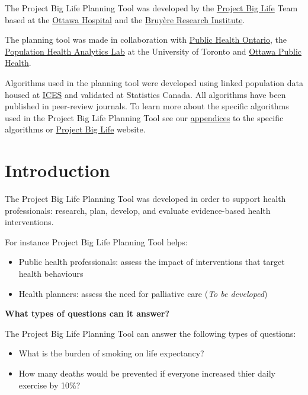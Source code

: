\documentclass[]{book}
\providecommand{\tightlist}{%
  \setlength{\itemsep}{0pt}\setlength{\parskip}{0pt}}
\begin{document}
The Project Big Life Planning Tool was developed by the \href{https://www.projectbiglife.ca}{Project Big Life} Team based at the \href{http://www.ohri.ca/home.asp}{Ottawa Hospital} and the \href{https://www.bruyere.org/en/bruyere-research-institute}{Bruyère Research Institute}.

The planning tool was made in collaboration with \href{https://www.publichealthontario.ca/}{Public Health Ontario}, the \href{https://pophealthanalytics.com/}{Population Health Analytics Lab} at the University of Toronto and \href{http://www.ottawapublichealth.ca/en/index.aspx}{Ottawa Public Health}.

Algorithms used in the planning tool were developed using linked population data housed at \href{https://www.ices.on.ca/}{ICES} and validated at Statistics Canada. All algorithms have been published in peer-review journals. To learn more about the specific algorithms used in the Project Big Life Planning Tool see our \protect\hyperlink{mport}{appendices} to the specific algorithms or \href{https://www.projectbiglife.ca/science}{Project Big Life} website.

\hypertarget{introduction}{%
\chapter{Introduction}\label{introduction}}

The Project Big Life Planning Tool was developed in order to support health professionals: research, plan, develop, and evaluate evidence-based health interventions.

For instance Project Big Life Planning Tool helps:

\begin{itemize}
\tightlist
\item
  Public health professionals: assess the impact of interventions that target health behaviours
\item
  Health planners: assess the need for palliative care (\emph{To be developed})
\end{itemize}

\textbf{What types of questions can it answer?}

The Project Big Life Planning Tool can answer the following types of questions:

\begin{itemize}
\tightlist
\item
  What is the burden of smoking on life expectancy?
\item
  How many deaths would be prevented if everyone increased thier daily exercise by 10\%?
\end{itemize}
\end{document}
